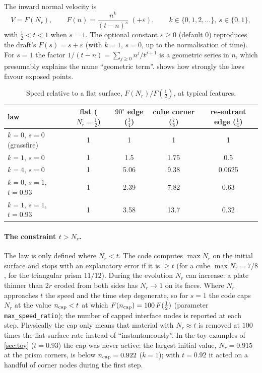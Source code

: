 \documentclass[11pt]{article}
\newcommand{\N}{N_r}
\newcommand{\code}[1]{\texttt{#1}}
\begin{document}
The inward normal velocity is
\begin{equation}\label{eq:law}
V=F(\N),\qquad F(n)=\frac{n^k}{(t-n)^s}\;(+\varepsilon),\qquad k\in\{0,1,2,\dots\},\ s\in\{0,1\},
\end{equation}
with $\frac12<t<1$ when $s=1$. The optional constant $\varepsilon\ge0$ (default $0$) reproduces the
draft's $F(s)=s+\varepsilon$ (with $k=1$, $s=0$, up to the normalisation of time). For $s=1$ the factor
$1/(t-n)=\sum_{j\ge0}n^j/t^{j+1}$ is a geometric series in $n$, which presumably explains the name
``geometric term''.  shows how strongly the laws favour exposed points.

\begin{table}[h]
\centering\small
\begin{tabular}{lcccc}
\toprule
law & flat ($\N=\frac12$) & $90^\circ$ edge ($\frac34$) & cube corner ($\frac78$) & re-entrant edge ($\frac14$)\\
\midrule
$k=0$, $s=0$ (grassfire) & 1 & 1 & 1 & 1\\
$k=1$, $s=0$ & 1 & 1.5 & 1.75 & 0.5\\
$k=4$, $s=0$ & 1 & 5.06 & 9.38 & 0.0625\\
$k=0$, $s=1$, $t=0.93$ & 1 & 2.39 & 7.82 & 0.63\\
$k=1$, $s=1$, $t=0.93$ & 1 & 3.58 & 13.7 & 0.32\\
\bottomrule
\end{tabular}
\caption{Speed relative to a flat surface, $F(\N)/F(\frac12)$, at typical features.}\label{tab:ratios}
\end{table}

\paragraph{The constraint $t>\N$.} The law is only defined where $\N<t$. The code computes $\max\N$ on the
initial surface and stops with an explanatory error if it is $\ge t$ (for a cube $\max\N=7/8$, for the
triangular prism $11/12$). During the evolution $\N$ can increase: a plate thinner than $2r$ eroded from
both sides has $\N\to1$ on its faces. Where $\N$ approaches $t$ the speed and the time step degenerate,
so for $s=1$ the code caps $\N$ at the value $n_{\rm cap}<t$ at which $F(n_{\rm cap})=100\,F(\frac12)$
(parameter \code{max\_speed\_ratio}); the number of capped interface nodes is reported at each step.
Physically the cap only means that material with $\N\approx t$ is removed at $100$ times the flat-surface
rate instead of ``instantaneously''. In the toy examples of \cref{sec:toy} ($t=0.93$) the cap was never
active: the largest initial value, $\N=0.915$ at the prism corners, is below $n_{\rm cap}=0.922$ ($k=1$);
with $t=0.92$ it acted on a handful of corner nodes during the first step.
\end{document}
